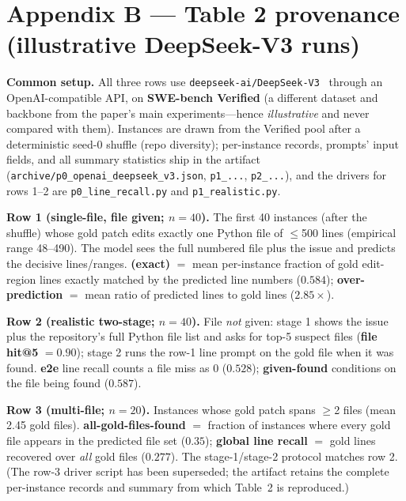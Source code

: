\documentclass[11pt]{article}
\newcommand{\code}[1]{\texttt{#1}}
\begin{document}
\section*{Appendix B --- Table 2 provenance (illustrative DeepSeek-V3 runs)}

\noindent\textbf{Common setup.} All three rows use \code{deepseek-ai/DeepSeek-V3}~\citep{deepseekv3} through an OpenAI-compatible API, on \textbf{SWE-bench Verified} (a different dataset and backbone from the paper's main experiments---hence \emph{illustrative} and never compared with them). Instances are drawn from the Verified pool after a deterministic seed-0 shuffle (repo diversity); per-instance records, prompts' input fields, and all summary statistics ship in the artifact (\code{archive/p0\_openai\_deepseek\_v3.json}, \code{p1\_...}, \code{p2\_...}), and the drivers for rows 1--2 are \code{p0\_line\_recall.py} and \code{p1\_realistic.py}.

\smallskip\noindent\textbf{Row 1 (single-file, file given; $n{=}40$).} The first 40 instances (after the shuffle) whose gold patch edits exactly one Python file of $\le$500 lines (empirical range 48--490). The model sees the full numbered file plus the issue and predicts the decisive lines/ranges. \textbf{(exact)} $=$ mean per-instance fraction of gold edit-region lines exactly matched by the predicted line numbers ($0.584$); \textbf{over-prediction} $=$ mean ratio of predicted lines to gold lines ($2.85\times$).

\smallskip\noindent\textbf{Row 2 (realistic two-stage; $n{=}40$).} File \emph{not} given: stage 1 shows the issue plus the repository's full Python file list and asks for top-5 suspect files (\textbf{file hit@5} $=0.90$); stage 2 runs the row-1 line prompt on the gold file when it was found. \textbf{e2e} line recall counts a file miss as 0 ($0.528$); \textbf{given-found} conditions on the file being found ($0.587$).

\smallskip\noindent\textbf{Row 3 (multi-file; $n{=}20$).} Instances whose gold patch spans $\ge$2 files (mean 2.45 gold files). \textbf{all-gold-files-found} $=$ fraction of instances where every gold file appears in the predicted file set ($0.35$); \textbf{global line recall} $=$ gold lines recovered over \emph{all} gold files ($0.277$). The stage-1/stage-2 protocol matches row 2. (The row-3 driver script has been superseded; the artifact retains the complete per-instance records and summary from which Table~2 is reproduced.)
\end{document}
